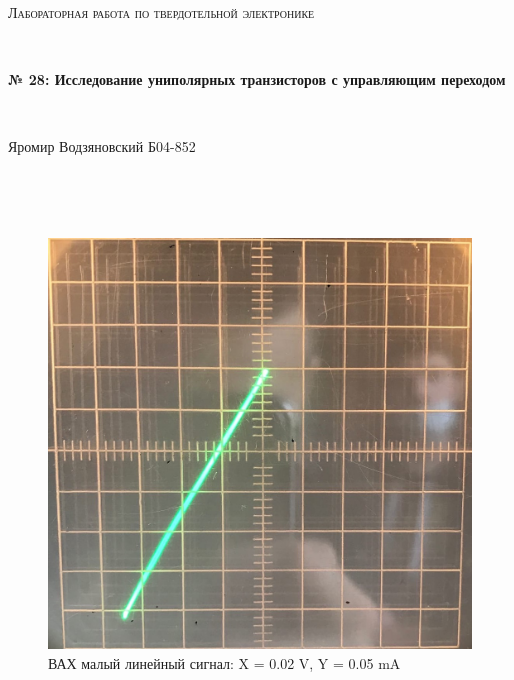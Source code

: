 \documentclass[a4paper]{article}
\begin{document}
\graphicspath{ {pic/} }
\begin{center}
    {\scshape\Large Лабораторная работа по твердотельной электронике} \par

    \

    {\huge\bfseries № 28: Исследование униполярных транзисторов с управляющим переходом} \par 

    \

    {\large Яромир Водзяновский Б04-852}
\end{center}

\

\

\begin{figure}[h]
    \begin{center}
    \begin{minipage}[h]{0.4\linewidth}
        \includegraphics[width=1\linewidth]{vah1.jpg}
        \caption{ВАХ малый линейный сигнал: X = 0.02 V, Y = 0.05 mA}
        \label{vah1}
    \end{minipage}
    \hfill 
    \begin{minipage}[h]{0.4\linewidth}

\end{minipage}
\end{center}
\end{figure}
\end{document}
